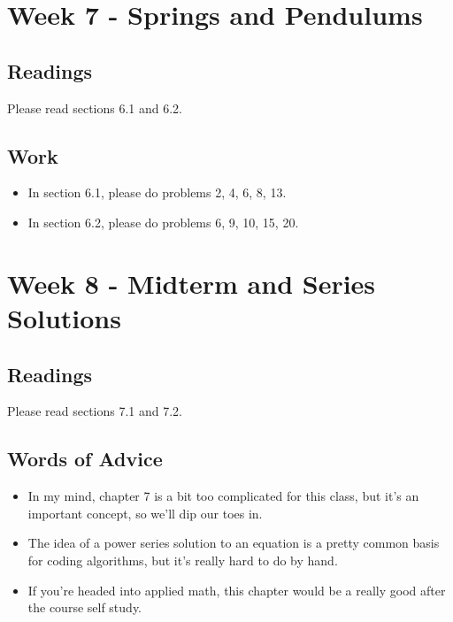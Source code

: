 
	\section{Week 7 - Springs and Pendulums}

	\subsection{Readings}
		Please read sections 6.1 and 6.2.

	\subsection{Work}
		\begin{itemize}
			\item In section 6.1, please do problems 2, 4, 6, 8, 13.
			\item In section 6.2, please do problems 6, 9, 10, 15, 20.
		\end{itemize}

	\clearpage



	\section{Week 8 - Midterm and Series Solutions}

	\subsection{Readings}
		Please read sections 7.1 and 7.2.

	\subsection{Words of Advice}
		\begin{itemize}
			\item In my mind, chapter 7 is a bit too complicated for this class, but it's an important concept, so we'll dip our toes in.
			\item The idea of a power series solution to an equation is a pretty common basis for coding algorithms, but it's really hard to do by hand.
			\item If you're headed into applied math, this chapter would be a really good after the course self study.
		\end{itemize}

